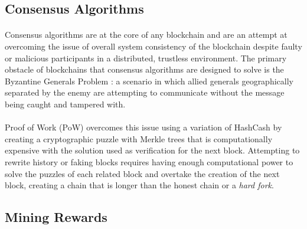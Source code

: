 \subsection{Consensus Algorithms}


\paragraph{} Consensus algorithms are at the core of any blockchain and are an attempt at overcoming the issue of overall system consistency of the blockchain despite faulty or malicious participants in a distributed, trustless environment. The primary obstacle of blockchains that consensus algorithms are designed to solve is the Byzantine Generals Problem \cite{lamportshostakpease1982}: a scenario in which allied generals geographically separated by the enemy are attempting to communicate without the message being caught and tampered with. 

\paragraph{} Proof of Work (PoW) overcomes this issue using a variation of HashCash \cite{back2002} by creating a cryptographic puzzle with Merkle trees that is computationally expensive with the solution used as verification for the next block. Attempting to rewrite history or faking blocks requires having enough computational power to solve the puzzles of each related block and overtake the creation of the next block, creating a chain that is longer than the honest chain or a \textit{hard fork}.


\subsection{Mining Rewards}



